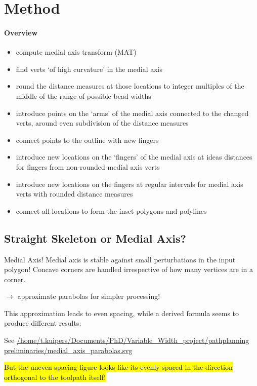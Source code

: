 \section{Method}
\paragraph{Overview}
\begin{itemize}
\item compute medial axis transform (MAT)
\item find verts `of high curvature' in the medial axis
\item round the distance measures at those locations to integer multiples of the middle of the range of possible bead widths
\item introduce points on the `arms' of the medial axis connected to the changed verts, around even subdivision of the distance measures
\item connect points to the outline with new fingers
\item introduce new locations on the `fingers' of the medial axis at ideas distances for fingers from non-rounded medial axis verts
\item introduce new locations on the fingers at regular intervals for medial axis verts with rounded distance measures
\item connect all locations to form the inset polygons and polylines
\end{itemize}


\subsection{Straight Skeleton or Medial Axis?}
Medial Axis!
Medial axis is stable against small perturbations in the input polygon!
Concave corners are handled irrespective of how many vertices are in a corner.


$\to$ approximate parabolas for simpler processing!

This approximation leads to even spacing,
while a derived formula seems to produce different results:

See \url{/home/t.kuipers/Documents/PhD/Variable_Width_project/pathplanning preliminaries/medial_axis_parabolas.svg}


\hl{But the uneven spacing figure looks like its evenly spaced in the direction orthogonal to the toolpath itself!}


